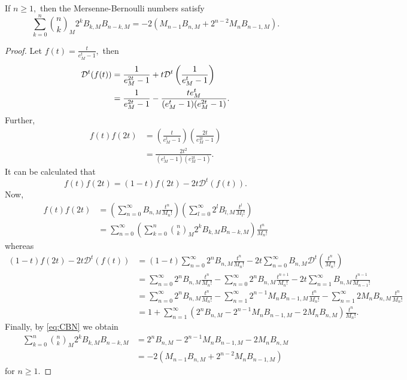 \documentclass[10pt,a4paper]{amsart}
\begin{document}
\begin{theorem}
If $n \geq 1,$ then the Mersenne-Bernoulli numbers satisfy 
\begin{equation*}
\sum_{k=0}^{n}\binom{n}{k}_M 2^k B_{k,M}B_{n-k,M} = -2(M_{n-1}B_{n,M}+2^{n-2}M_nB_{n-1,M}).
\end{equation*}
\end{theorem}

\begin{proof}
Let $f(t) = \frac{t}{e^t_M-1},$ then
\begin{align*}
\mathcal{D}^t(f(t))&= \frac{1}{e^{2t}_M-1}+t\mathcal{D}^t\left(\frac{1}{e^t_M-1}\right)\notag\\
&= \frac{1}{e^{2t}_M-1}-\frac{te^t_M}{(e^t_M-1)(e^{2t}_M-1)}.
\end{align*}
Further,
\begin{align*} 
f(t)f(2t) &= \left(\frac{t}{e^t_M-1}\right)\left(\frac{2t}{e^{2t}_M-1}\right)\\
&= \frac{2t^2}{(e^t_M-1)(e^{2t}_M-1)}.
\end{align*}
It can be calculated that
\begin{equation} \label{eq:CBN}
f(t)f(2t) = (1-t)f(2t)-2t\mathcal{D}^t(f(t)).
\end{equation}
Now,
\begin{align*}
f(t)f(2t) &= \left(\sum_{n=0}^{\infty}B_{n,M}\frac{t^n}{M_n!}\right)\left(\sum_{l=0}^{\infty}2^lB_{l,M}\frac{t^l}{M_l!}\right)\\
&= \sum_{n=0}^{\infty}\left(\sum_{k=0}^{n}\binom{n}{k}_M2^kB_{k,M}B_{n-k,M}\right)\frac{t^n}{M_n!}
\end{align*}
whereas
\begin{align*}
(1-t)f(2t)-2t\mathcal{D}^t(f(t)) &= (1-t)\sum_{n=0}^{\infty}2^nB_{n,M}\frac{t^n}{M_n!}-2t\sum_{n=0}^{\infty}B_{n,M}\mathcal{D}^t\left(\frac{t^n}{M_n!}\right)\\
&= \sum_{n=0}^{\infty}2^nB_{n,M}\frac{t^n}{M_n!}-\sum_{n=0}^{\infty}2^nB_{n,M}\frac{t^{n+1}}{M_n!}-2t\sum_{n=1}^{\infty}B_{n,M}\frac{t^{n-1}}{M_{n-1}!}\\
&= \sum_{n=0}^{\infty}2^nB_{n,M}\frac{t^n}{M_n!}-\sum_{n=1}^{\infty}2^{n-1}M_nB_{n-1,M}\frac{t^n}{M_n!}-\sum_{n=1}^{\infty}2M_nB_{n,M}\frac{t^n}{M_n!}\\
&= 1+\sum_{n=1}^{\infty}(2^nB_{n,M}-2^{n-1}M_nB_{n-1,M}-2M_nB_{n,M})\frac{t^n}{M_n!}.
\end{align*}
Finally, by \eqref{eq:CBN} we obtain
\begin{align*}
\sum_{k=0}^{n}\binom{n}{k}_M2^kB_{k,M}B_{n-k,M}
&= 2^nB_{n,M}-2^{n-1}M_nB_{n-1,M}-2M_nB_{n,M}\\
&= -2(M_{n-1}B_{n,M}+2^{n-2}M_nB_{n-1,M})
\end{align*}
for $n \geq 1.$
\end{proof}
\end{document}
